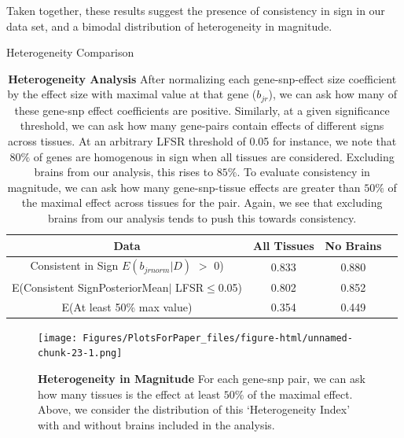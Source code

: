 Taken together, these results suggest the presence of consistency in sign in our data set, and a bimodal distribution of heterogeneity in magnitude.

\begin{table}[htbp]
\caption{Heterogeneity Comparison}
\centering
\begin{tabular}{c c c c}
\hline\hline
Data & All Tissues  & No Brains  \\ [0.5ex] %
\hline
Consistent in Sign $E(b_{jrnorm}|D)$ $>$ 0) &0.833&0.880 \\
E(Consistent SignPosteriorMean$\mid$ LFSR$\leq$0.05)&0.802&0.852\\
E(At least 50\% max value) &0.354&0.449\\
\hline
\end{tabular}
\label{table:het}
\caption{\textbf{Heterogeneity Analysis} After normalizing each gene-snp-effect size coefficient by the effect size with maximal value at that gene ($b_{jr}$), we can ask how many of these gene-snp effect coefficients are positive. Similarly, at a given significance threshold, we can ask how many gene-pairs contain effects of different signs across tissues. At an arbitrary LFSR threshold of 0.05 for instance, we note that $80\%$ of genes are homogenous in sign when all tissues are considered. Excluding brains from our analysis, this rises to $85\%$. To evaluate consistency in magnitude, we can ask how many gene-snp-tissue effects are greater than $50\%$ of the maximal effect across tissues for the pair. Again, we see that excluding brains from our analysis tends to push this towards consistency.}
\end{table} \newline


\newline
\begin{figure}[htbp]
\texttt{[image: Figures/PlotsForPaper\_files/figure-html/unnamed-chunk-23-1.png]}\\
\caption{\textbf{Heterogeneity in Magnitude} For each gene-snp pair, we can ask how many tissues is the effect at least $50\%$ of the maximal effect. Above, we consider the distribution of this `Heterogeneity Index' with and without brains included in the analysis.}
\label{fig:het}
\end{figure}


